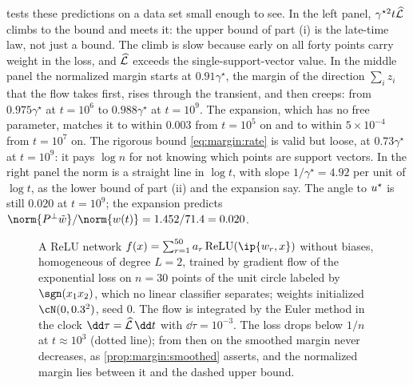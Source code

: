 \begin{refsection}
 tests these predictions on a data set small enough to see. In the left panel, $\gamma^{\star2}t\widehat{\mathcal{L}}$ climbs to the bound and meets it: the upper bound of part (i) is the late-time law, not just a bound. The climb is slow because early on all forty points carry weight in the loss, and $\widehat{\mathcal{L}}$ exceeds the single-support-vector value. In the middle panel the normalized margin starts at $0.91\gamma^\star$, the margin of the direction $\sum_iz_i$ that the flow takes first, rises through the transient, and then creeps: from $0.975\gamma^\star$ at $t=10^6$ to $0.988\gamma^\star$ at $t=10^9$. The expansion, which has no free parameter, matches it to within $0.003$ from $t=10^5$ on and to within $5\times10^{-4}$ from $t=10^7$ on. The rigorous bound \eqref{eq:margin:rate} is valid but loose, at $0.73\gamma^\star$ at $t=10^9$: it pays $\log n$ for not knowing which points are support vectors. In the right panel the norm is a straight line in $\log t$, with slope $1/\gamma^\star=4.92$ per unit of $\log t$, as the lower bound of part (ii) and the expansion say. The angle to $u^\star$ is still $0.020$ at $t=10^9$; the expansion predicts $\norm{P^\perp\marginwt}/\norm{w(t)}=1.452/71.4=0.020$.

\begin{figure}[t]
\centering
{}
\caption{A ReLU network $f(x)=\sum_{r=1}^{50}a_r\relu(\ip{w_r,x})$ without biases, homogeneous of degree $L=2$, trained by gradient flow of the exponential loss on $n=30$ points of the unit circle labeled by $\sgn(x_1x_2)$, which no linear classifier separates; weights initialized $\cN(0,0.3^2)$, seed $0$. The flow is integrated by the Euler method in the clock $\dd\tau=\Lhat\,\dd t$ with $\dd\tau=10^{-3}$. The loss drops below $1/n$ at $t\approx10^3$ (dotted line); from then on the smoothed margin never decreases, as \cref{prop:margin:smoothed} asserts, and the normalized margin lies between it and the dashed upper bound.}\label{fig:margin:relu}
\end{figure}


\end{refsection}
